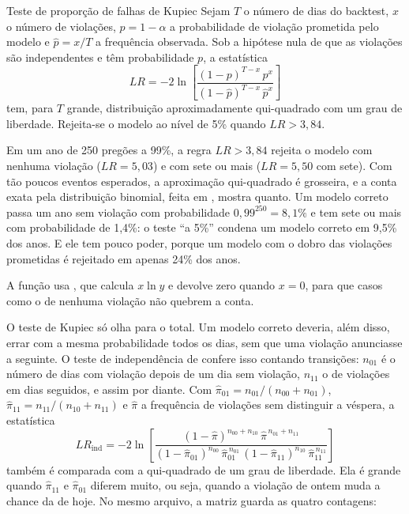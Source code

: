 \begin{resultado}{Teste de proporção de falhas de Kupiec}
Sejam $T$ o número de dias do backtest, $x$ o número de violações, $p = 1-\alpha$ a probabilidade de violação prometida pelo modelo e $\hat{p} = x/T$ a frequência observada. Sob a hipótese nula de que as violações são independentes e têm probabilidade $p$, a estatística
\begin{equation}
  LR = -2 \ln\!\left[\frac{(1-p)^{T-x}\, p^{x}}{(1-\hat{p})^{T-x}\, \hat{p}^{x}}\right]
  \label{eq:c07-kupiec}
\end{equation}
tem, para $T$ grande, distribuição aproximadamente qui-quadrado com um grau de liberdade. Rejeita-se o modelo ao nível de 5\% quando $LR > 3,84$.
\end{resultado}

Em um ano de 250 pregões a 99\%, a regra $LR > 3,84$ rejeita o modelo com nenhuma violação ($LR = 5,03$) e com sete ou mais ($LR = 5,50$ com sete). Com tão poucos eventos esperados, a aproximação qui-quadrado é grosseira, e a conta exata pela distribuição binomial, feita em , mostra quanto. Um modelo correto passa um ano sem violação com probabilidade $0,99^{250} = 8,1\%$ e tem sete ou mais com probabilidade de 1,4\%: o teste ``a 5\%'' condena um modelo correto em 9,5\% dos anos. E ele tem pouco poder, porque um modelo com o dobro das violações prometidas é rejeitado em apenas 24\% dos anos.



A função usa , que calcula $x \ln y$ e devolve zero quando $x = 0$, para que casos como o de nenhuma violação não quebrem a conta.

O teste de Kupiec só olha para o total. Um modelo correto deveria, além disso, errar com a mesma probabilidade todos os dias, sem que uma violação anunciasse a seguinte. O teste de independência de \citet{christoffersen1998} confere isso contando transições: $n_{01}$ é o número de dias com violação depois de um dia sem violação, $n_{11}$ o de violações em dias seguidos, e assim por diante. Com $\hat\pi_{01} = n_{01}/(n_{00}+n_{01})$, $\hat\pi_{11} = n_{11}/(n_{10}+n_{11})$ e $\hat\pi$ a frequência de violações sem distinguir a véspera, a estatística
\begin{equation}
  LR_{\text{ind}} = -2 \ln\!\left[\frac{(1-\hat\pi)^{n_{00}+n_{10}}\, \hat\pi^{\,n_{01}+n_{11}}}{(1-\hat\pi_{01})^{n_{00}}\, \hat\pi_{01}^{\,n_{01}}\, (1-\hat\pi_{11})^{n_{10}}\, \hat\pi_{11}^{\,n_{11}}}\right]
  \label{eq:c07-christoffersen}
\end{equation}
também é comparada com a qui-quadrado de um grau de liberdade. Ela é grande quando $\hat\pi_{11}$ e $\hat\pi_{01}$ diferem muito, ou seja, quando a violação de ontem muda a chance da de hoje. No mesmo arquivo, a matriz  guarda as quatro contagens:

